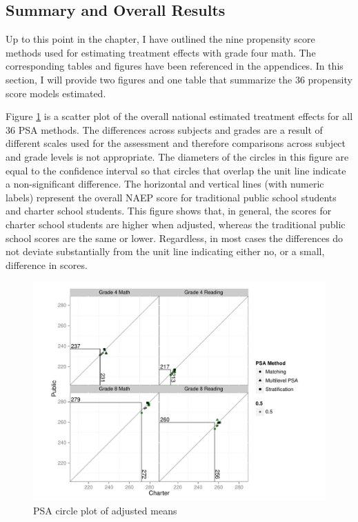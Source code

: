 \documentclass[letterpaper,12p,twoside]{article} %
\begin{document}
\subsection{Summary and Overall Results}

Up to this point in the chapter, I have outlined the nine propensity score methods used for estimating treatment effects with grade four math. The corresponding tables and figures have been referenced in the appendices. In this section, I will provide two figures and one table that summarize the 36 propensity score models estimated.

Figure \ref{fig:overallcirc} is a scatter plot of the overall national estimated treatment effects for all 36 PSA methods. The differences across subjects and grades are a result of different scales used for the assessment and therefore comparisons across subject and grade levels is not appropriate. The diameters of the circles in this figure are equal to the confidence interval so that circles that overlap the unit line indicate a non-significant difference. The horizontal and vertical lines (with numeric labels) represent the overall NAEP score for traditional public school students and charter school students. This figure shows that, in general, the scores for charter school students are higher when adjusted, whereas the traditional public school scores are the same or lower. Regardless, in most cases the differences do not deviate substantially from the unit line indicating either no, or a small, difference in scores.

\begin{figure}[t]
\begin{center}
\includegraphics[width=\textwidth]{../Figures2009/OverallScatter.pdf}
\caption{PSA circle plot of adjusted means}
\label{fig:overallcirc}
\end{center}
\end{figure}
\end{document}
